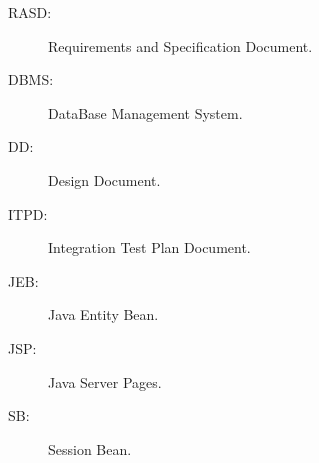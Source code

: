 \begin{description}
\item[RASD:] Requirements and Specification Document.
\item[DBMS:] DataBase Management System.
\item[DD:] Design Document.
\item[ITPD:] Integration Test Plan Document.
\item[JEB:] Java Entity Bean.
\item[JSP:] Java Server Pages.
\item[SB:] Session Bean.
\end{description}